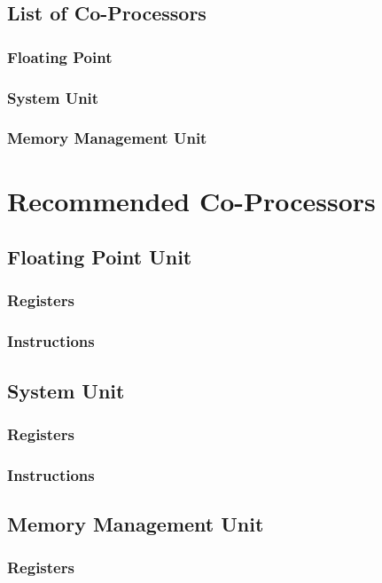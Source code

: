 \documentclass[letterpaper, 11pt]{article}
\begin{document}
\subsection{List of Co-Processors}
\subsubsection{Floating Point}
\subsubsection{System Unit}
\subsubsection{Memory Management Unit}
\subsubsection{}

\section{Recommended Co-Processors}
\subsection{Floating Point Unit}
\subsubsection{Registers}
\subsubsection{Instructions}
\subsection{System Unit}
\subsubsection{Registers}
\subsubsection{Instructions}
\subsection{Memory Management Unit}
\subsubsection{Registers}
\end{document}
